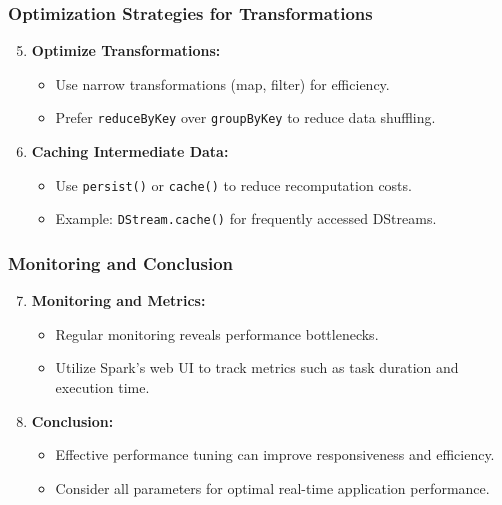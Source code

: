 \documentclass[aspectratio=169]{beamer}
\begin{document}
\begin{frame}
    \frametitle{Optimization Strategies for Transformations}
    \begin{enumerate}
        \setcounter{enumi}{4}
        \item \textbf{Optimize Transformations:}
        \begin{itemize}
            \item Use narrow transformations (map, filter) for efficiency.
            \item Prefer \texttt{reduceByKey} over \texttt{groupByKey} to reduce data shuffling.
        \end{itemize}
        
        \item \textbf{Caching Intermediate Data:}
        \begin{itemize}
            \item Use \texttt{persist()} or \texttt{cache()} to reduce recomputation costs.
            \item Example: \texttt{DStream.cache()} for frequently accessed DStreams.
        \end{itemize}
    \end{enumerate}
\end{frame}

\begin{frame}
    \frametitle{Monitoring and Conclusion}
    \begin{enumerate}
        \setcounter{enumi}{6}
        \item \textbf{Monitoring and Metrics:}
        \begin{itemize}
            \item Regular monitoring reveals performance bottlenecks.
            \item Utilize Spark’s web UI to track metrics such as task duration and execution time.
        \end{itemize}
        
        \item \textbf{Conclusion:}
        \begin{itemize}
            \item Effective performance tuning can improve responsiveness and efficiency.
            \item Consider all parameters for optimal real-time application performance.
        \end{itemize}
    \end{enumerate}
\end{frame}
\end{document}
